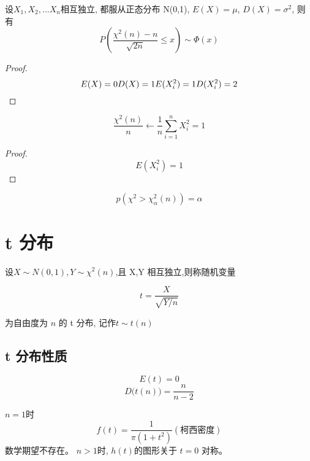 \begin{corollary}[卡方分布中心极限定理]
    设$X_1,X_2,...X_n$相互独立, 都服从正态分布 N(0,1), $E(X)=\mu$, $D(X)=\sigma^2$, 则有
    $$
        P(\frac{\chi^2(n)-n}{\sqrt{2n}} \le x) \sim \Phi(x)
    $$
\end{corollary}

\begin{proof}
    $$
        E(X) = 0\\
        D(X) = 1\\
        E(X_i^2) = 1\\
        D(X_i^2) = 2
    $$
\end{proof}

\begin{corollary}
    $$
        \frac{\chi^2(n)}{n} \leftarrow  \frac{1}{n} \sum^n_{i=1} X_i^2 = 1
    $$
\end{corollary}

\begin{proof}
    $$
        E(X_i^2) = 1
    $$
\end{proof}

\begin{definition}[卡方分布的上分位点]
    $$
        p(\chi^2 > \chi^2_\alpha(n)) = \alpha
    $$
\end{definition}

\section{t 分布}

\begin{definition}[自由度为 $t$ 的 t 分布]
    设$X \sim N(0,1), Y \sim \chi^2(n)$,且 X,Y 相互独立,则称随机变量

    $$
        t = \frac{X}{\sqrt{Y/n}}
    $$

    为自由度为 $n$ 的 t 分布, 记作$t \sim t(n)$

\end{definition}

\subsection{t 分布性质}

\begin{corollary}[t 分布数学期望和方差]
    $$
        E(t) = 0
    $$
    $$
        D\big(t(n)\big) = \frac{n}{n-2}
    $$
\end{corollary}

\begin{corollary}[t 分布的概率密度函数]
    $n = 1$时 $$f(t)=\frac{1}{\pi (1+t^2)}(柯西密度)$$ 数学期望不存在。
    $n>1$时, $h(t)$的图形关于 $t=0$ 对称。
\end{corollary}

